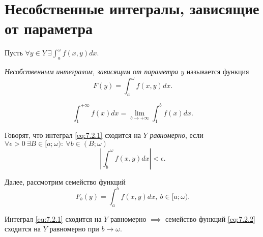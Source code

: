 

\section{Несобственные интегралы, зависящие от параметра}

\begin{definition}
    Пусть $ \forall y \in Y \ \exists \int_{a}^{\omega}f(x,y)dx $.

    \emph{Несобственным интегралом, зависящим от параметра $ y $} называется функция
    \begin{equation}\label{eq:7.2.1}
        F(y) = \int_{a}^{\omega}f(x,y)dx.
    \end{equation}
\end{definition}

\begin{example}
    \[
        \int_{1}^{+\infty} f(x)dx = \underset{b \rightarrow + \infty}{\lim}\int_{1}^{b}f(x)dx.
    \]
\end{example}

\begin{definition}
    Говорят, что интеграл \ref{eq:7.2.1} сходится на $ Y $ \emph{равномерно}, если $ \forall \epsilon > 0 \ \exists B \in [a;\omega): \ \forall b \in (B;\omega) $
    \[
        \left|\int_{b}^{\omega}f(x,y)dx\right| < \epsilon.
    \]
\end{definition}

\begin{note}
    Далее, рассмотрим семейство функций
    \begin{equation}\label{eq:7.2.2}
        F_b(y) = \int_{a}^{b}f(x,y)dx, \ b \in [a;\omega).
    \end{equation}
\end{note}

\begin{statement}
    Интеграл \ref{eq:7.2.1} сходится на $ Y $ равномерно $ \implies $ семейство функций \ref{eq:7.2.2} сходится на $ Y $ равномерно при $ b \rightarrow \omega $.
\end{statement}

